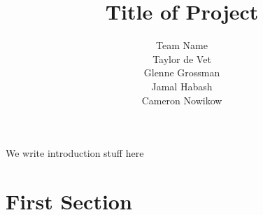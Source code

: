 \documentclass{article}
\title{Title of Project}
\author{Team Name
		\\ Taylor de Vet
    \\ Glenne Grossman
		\\ Jamal Habash
		\\ Cameron Nowikow
}
\date{}
\begin{document}
\newpage

\maketitle

We write introduction stuff here

\section{First Section}
\end{document}
